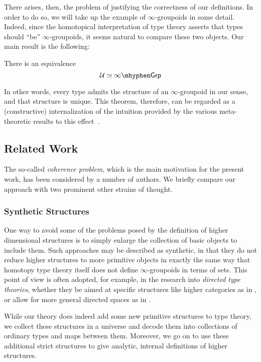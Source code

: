 There arises, then, the problem of justifying the correctness of our
definitions.  In order to do so, we will take up the example of
$\infty$-groupoids in some detail.  Indeed, since the homotopical
interpretation of type theory asserts that types should ``be''
$\infty$-groupoids, it seems natural to compare these two objects.
Our main result is the following:
\begin{thm*}
  There is an equivalence
  \[ \UU \simeq \infty\mhyphen\mathsf{Grp} \]
\end{thm*}
In other words, every type admits the structure of an
$\infty$-groupoid in our sense, and that structure is unique.  This
theorem, therefore, can be regarded as a (constructive)
internalization of the intuition provided by the various
meta-theoretic results to this effect~\cite{van2011types,
  lumsdaine2009weak}.

\subsection{Related Work}
\label{sec:related-work}

The so-called \emph{coherence problem}, which is the main motivation
for the present work, has been considered by a number of authors.  We
briefly compare our approach with two prominent other strains of
thought.

\subsubsection{Synthetic Structures}

One way to avoid some of the problems posed by the definition of
higher dimensional structures is to simply enlarge the collection of
basic objects to include them.  Such approaches may be described as
synthetic, in that they do not reduce higher structures to more
primitive objects in exactly the same way that homotopy type theory
itself does not define $\infty$-groupoids in terms of sets.  This
point of view is often adopted, for example, in the research into
\emph{directed type theories}, whether they be aimed at specific
structures like higher categories as in \cite{north2019towards}, or
allow for more general directed spaces as in \cite{riehl2017type}.

While our theory does indeed add some new primitive structures to type
theory, we collect these structures in a universe and decode them into
collections of ordinary types and maps between them.  Moreover, we go
on to use these additional strict structures to give analytic,
internal definitions of higher structures.

